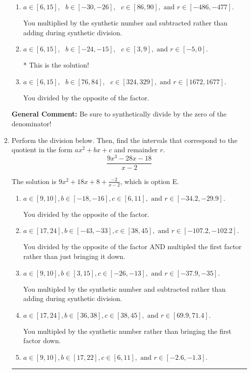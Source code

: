 \documentclass{extbook}[14pt]
\newcommand{\litem}[1]{\item #1

\rule{\textwidth}{0.4pt}}
\begin{document}
\begin{enumerate}
{\begin{enumerate}[label=\Alph*.]
 You multiplied by the synthetic number rather than bringing the first factor down.
\item \( a \in [6, 15], \text{   } b \in [-30, -26], \text{   } c \in [86, 90], \text{   and   } r \in [-486, -477]. \)

 You multiplied by the synthetic number and subtracted rather than adding during synthetic division.
\item \( a \in [6, 15], \text{   } b \in [-24, -15], \text{   } c \in [3, 9], \text{   and   } r \in [-5, 0]. \)

* This is the solution!
\item \( a \in [6, 15], \text{   } b \in [76, 84], \text{   } c \in [324, 329], \text{   and   } r \in [1672, 1677]. \)

 You divided by the opposite of the factor.
\end{enumerate}

\textbf{General Comment:} Be sure to synthetically divide by the zero of the denominator!
}
\litem{
Perform the division below. Then, find the intervals that correspond to the quotient in the form $ax^2+bx+c$ and remainder $r$.
\[ \frac{9x^{3} -28 x -18}{x -2} \]

The solution is \( 9x^{2} +18 x + 8 + \frac{-2}{x -2} \), which is option E.\begin{enumerate}[label=\Alph*.]
\item \( a \in [9, 10], b \in [-18, -16], c \in [6, 11], \text{ and } r \in [-34.2, -29.9]. \)

 You divided by the opposite of the factor.
\item \( a \in [17, 24], b \in [-43, -33], c \in [38, 45], \text{ and } r \in [-107.2, -102.2]. \)

 You divided by the opposite of the factor AND multipled the first factor rather than just bringing it down.
\item \( a \in [9, 10], b \in [3, 15], c \in [-26, -13], \text{ and } r \in [-37.9, -35]. \)

 You multipled by the synthetic number and subtracted rather than adding during synthetic division.
\item \( a \in [17, 24], b \in [36, 38], c \in [38, 45], \text{ and } r \in [69.9, 71.4]. \)

 You multipled by the synthetic number rather than bringing the first factor down.
\item \( a \in [9, 10], b \in [17, 22], c \in [6, 11], \text{ and } r \in [-2.6, -1.3]. \)


\end{enumerate}}
\end{enumerate}
\end{document}
